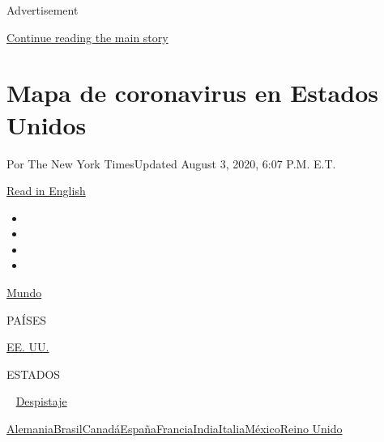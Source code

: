 Advertisement

\protect\hyperlink{after-top}{Continue reading the main story}

\hypertarget{mapa-de-coronavirus-en-estados-unidos}{%
\section{Mapa de coronavirus en Estados
Unidos}\label{mapa-de-coronavirus-en-estados-unidos}}

Por The New York TimesUpdated August 3, 2020, 6:07 P.M. E.T.

\href{https://www.nytimes.com/interactive/2020/us/coronavirus-us-cases.html}{Read
in English}

\begin{itemize}
\item
\item
\item
\item
\end{itemize}

\href{https://www.nytimes.com/interactive/2020/world/coronavirus-maps.html}{Mundo}~

PAÍSES

\textbar{}
\href{https://www.nytimes.com/es/interactive/2020/espanol/mundo/coronavirus-en-estados-unidos.html}{EE.
UU.}~

ESTADOS

~
\href{https://www.nytimes.com/interactive/2020/us/coronavirus-testing.html}{Despistaje}

\href{https://www.nytimes.com/interactive/2020/world/europe/germany-coronavirus-cases.html}{Alemania}\href{https://www.nytimes.com/interactive/2020/world/americas/brazil-coronavirus-cases.html}{Brasil}\href{https://www.nytimes.com/interactive/2020/world/canada/canada-coronavirus-cases.html}{Canadá}\href{https://www.nytimes.com/interactive/2020/world/europe/spain-coronavirus-cases.html}{España}\href{https://www.nytimes.com/interactive/2020/world/europe/france-coronavirus-cases.html}{Francia}\href{https://www.nytimes.com/interactive/2020/world/asia/india-coronavirus-cases.html}{India}\href{https://www.nytimes.com/interactive/2020/world/europe/italy-coronavirus-cases.html}{Italia}\href{https://www.nytimes.com/es/interactive/2020/espanol/america-latina/coronavirus-en-mexico.html}{México}\href{https://www.nytimes.com/interactive/2020/world/europe/united-kingdom-coronavirus-cases.html}{Reino
Unido}

